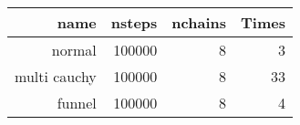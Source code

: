 \begin{table}
  \begin{tabular}{rrrr}
    \hline\hline
    \textbf{name} & \textbf{nsteps} & \textbf{nchains} & \textbf{Times} \\\hline
    normal & 100000 & 8 & 3 \\
    multi cauchy & 100000 & 8 & 33 \\
    funnel & 100000 & 8 & 4 \\\hline\hline
  \end{tabular}
\end{table}
